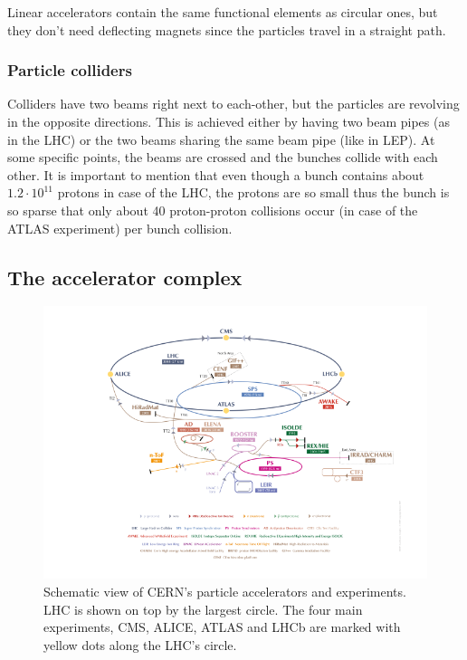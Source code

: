 \documentclass[12pt]{article}
\begin{document}
Linear accelerators contain the same functional elements as circular ones, but they don't need deflecting magnets since the particles travel in a straight path.


\subsubsection{Particle colliders}\label{sec_part_collider}

Colliders have two beams right next to each-other, but the particles are revolving in the opposite directions. This is achieved either by having two beam pipes (as in the LHC) or the two beams sharing the same beam pipe (like in LEP). At some specific points, the beams are crossed and the bunches collide with each other. It is important to mention that even though a bunch contains about $1.2\cdot 10^11$ protons\cite{lhc_facts_and_figures} in case of the LHC, the protons are so small thus the bunch is so sparse that only about 40 proton-proton collisions occur (in case of the ATLAS experiment) per bunch collision.


\subsection{The accelerator complex}\label{sec_accel_complex}

\begin{figure}[H]
	\includegraphics[width=\textwidth]{accelerator_complex}
	\caption{Schematic view of CERN's particle accelerators and experiments. LHC is shown on top by the largest circle. The four main experiments, CMS, ALICE, ATLAS and LHCb are marked with yellow dots along the LHC's circle.\cite{cern_accel_complex}}
	\label{fig_accel_complex}
\end{figure}
\end{document}
